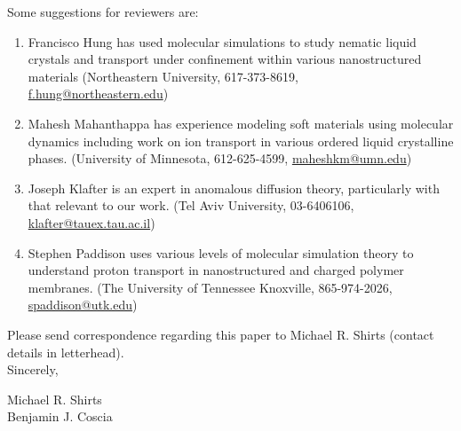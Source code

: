 \documentclass[fontsize=11pt]{article}
\begin{document}
	\noindent Some suggestions for reviewers are:
	\begin{enumerate}
	
		\item Francisco Hung has used molecular simulations to study nematic liquid crystals
		and transport under confinement within various nanostructured materials 
		(Northeastern University, 617-373-8619,\\ \href{mailto:f.hung@northeastern.edu}{f.hung@northeastern.edu})
		
		\item Mahesh Mahanthappa has experience modeling soft materials using molecular dynamics
		including work on ion transport in various ordered liquid crystalline phases. 
		(University of Minnesota, 612-625-4599, \href{mailto:maheshkm@umn.edu}{maheshkm@umn.edu})
		
		\item Joseph Klafter is an expert in anomalous diffusion theory, particularly with that 
		relevant to our work. (Tel Aviv University, 03-6406106, \href{mailto:klafter@tauex.tau.ac.il}{klafter@tauex.tau.ac.il})
		
		\item Stephen Paddison uses various levels of molecular simulation theory to understand
		proton transport in nanostructured and charged polymer membranes. (The University of Tennessee 
		Knoxville, 865-974-2026, \href{mailto:spaddison@utk.edu}{spaddison@utk.edu})
		
	\end{enumerate}
	
	\noindent Please send correspondence regarding this paper to Michael R. Shirts (contact
	details in letterhead).\\	
	
	\noindent Sincerely,
	
	\noindent Michael R. Shirts \\
	\noindent Benjamin J. Coscia \\
	
\end{document}
